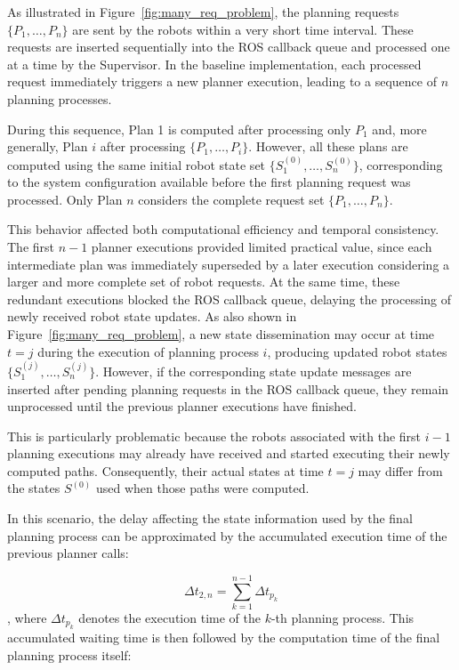 As illustrated in Figure~\ref{fig:many_req_problem}, the planning requests $\{P_1, \ldots, P_n\}$ are sent by the robots within a very short time interval. These requests are inserted sequentially into the ROS callback queue and processed one at a time by the Supervisor. In the baseline implementation, each processed request immediately triggers a new planner execution, leading to a sequence of $n$ planning processes.

During this sequence, Plan 1 is computed after processing only $P_1$ and, more generally, Plan $i$ after processing $\{P_1, \ldots, P_i\}$. However, all these plans are computed using the same initial robot state set $\{S_1^{(0)}, \ldots, S_n^{(0)}\}$, corresponding to the system configuration available before the first planning request was processed. Only Plan $n$ considers the complete request set $\{P_1, \ldots, P_n\}$.

This behavior affected both computational efficiency and temporal consistency. The first $n-1$ planner executions provided limited practical value, since each intermediate plan was immediately superseded by a later execution considering a larger and more complete set of robot requests. At the same time, these redundant executions blocked the ROS callback queue, delaying the processing of newly received robot state updates. As also shown in Figure~\ref{fig:many_req_problem}, a new state dissemination may occur at time $t=j$ during the execution of planning process $i$, producing updated robot states $\{S_1^{(j)}, \ldots, S_n^{(j)}\}$. However, if the corresponding state update messages are inserted after pending planning requests in the ROS callback queue, they remain unprocessed until the previous planner executions have finished.

This is particularly problematic because the robots associated with the first $i-1$ planning executions may already have received and started executing their newly computed paths. Consequently, their actual states at time $t=j$ may differ from the states $S^{(0)}$ used when those paths were computed. 

In this scenario, the delay affecting the state information used by the final planning process can be approximated by the accumulated execution time of the previous planner calls:

\begin{equation}
    \Delta t_{2,n} = \sum_{k=1}^{n-1} \Delta t_{p_k}
\end{equation}
, where $\Delta t_{p_k}$ denotes the execution time of the $k$-th planning process. This accumulated waiting time is then followed by the computation time of the final planning process itself:


